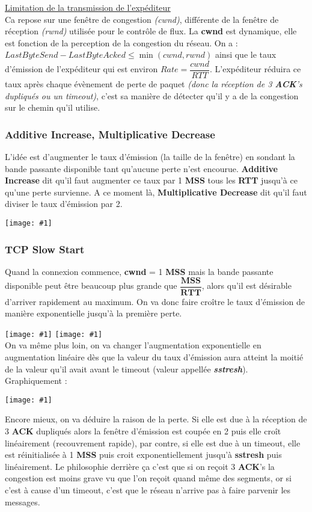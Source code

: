 \documentclass{article}
\newcommand{\imageR}[2]{\texttt{[image: \#1]}}
\newcommand{\imageRT}[2]{\texttt{[image: \#1]}}
\newcommand{\imgR}[2]{\begin{center}\texttt{[image: \#1]}\end{center}}
\begin{document}
\underline{Limitation de la transmission de l'expéditeur} \\
Ca repose sur une fenêtre de congestion \textit{(cwnd)}, différente de la fenêtre de réception \textit{(rwnd)}
utilisée pour le contrôle de flux. La \textbf{cwnd} est dynamique, elle est fonction de la perception de la 
congestion du réseau. On a : $LastByteSend - LastByteAcked \leq \min{(cwnd,rwnd)}$ ainsi que le taux d'émission
de l'expéditeur qui est environ $\boxed{Rate = \dfrac{cwnd}{RTT}}$. L'expéditeur réduira ce taux après chaque 
évènement de perte de paquet \textit{(donc la réception de 3 \textbf{ACK}'s dupliqués ou un timeout)}, c'est
sa manière de détecter qu'il y a de la congestion sur le chemin qu'il utilise.

\subsubsection{Additive Increase, Multiplicative Decrease}

L'idée est d'augmenter le taux d'émission (la taille de la fenêtre) en sondant la bande passante disponible tant 
qu'aucune perte n'est encourue. \textbf{Additive Increase} dit qu'il faut augmenter ce taux par 1 \textbf{MSS} 
tous les \textbf{RTT} jusqu'à ce qu'une perte survienne. A ce moment là, \textbf{Multiplicative Decrease} dit 
qu'il faut diviser le taux d'émission par 2.

\imgR{CN_063.png}{400}
\newpage
\subsubsection{TCP Slow Start}

Quand la connexion commence, \textbf{cwnd} = 1 \textbf{MSS} mais la bande passante disponible peut être beaucoup
plus grande que $\dfrac{\mathbf{MSS}}{\mathbf{RTT}}$, alors qu'il est désirable d'arriver rapidement au maximum. 
On va donc faire croître le taux d'émission de manière exponentielle jusqu'à la première perte.

\imageR{CN_064.png}{200} \imageRT{CN_065.png}{200} \\

On va même plus loin, on va changer l'augmentation exponentielle en augmentation linéaire dès que la valeur du
taux d'émission aura atteint la moitié de la valeur qu'il avait avant le timeout (valeur appellée 
\textit{\textbf{sstresh}}). Graphiquement : 

\imgR{CN_066.png}{200}

Encore mieux, on va déduire la raison de la perte. Si elle est due à la réception de 3 \textbf{ACK} dupliqués 
alors la fenêtre d'émission est coupée en 2 puis elle croît linéairement (recouvrement rapide), par contre, si 
elle est due à un timeout, elle est réinitialisée à 1 \textbf{MSS} puis croit exponentiellement jusqu'à 
\textbf{sstresh} puis linéairement. Le philosophie derrière ça c'est que si on reçoit 3 \textbf{ACK}'s la 
congestion est moins grave vu que l'on reçoit quand même des segments, or si c'est à cause d'un timeout, c'est 
que le réseau n'arrive pas à faire parvenir les messages. \\
\end{document}
